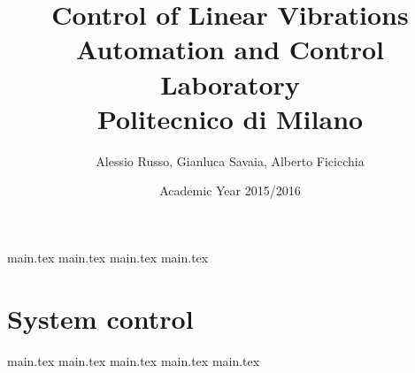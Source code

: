 \documentclass[10pt,a4paper]{report}
\author{Alessio Russo, Gianluca Savaia, Alberto Ficicchia}
\title{Control of Linear Vibrations \\
\Large Automation and Control Laboratory \\
 Politecnico di Milano}
\date{Academic Year 2015/2016}
\begin{document}
\maketitle
\tableofcontents

{main.tex}
{main.tex}
\newpage
{main.tex}
\newpage
{main.tex}
\newpage
\part{System control}
	{main.tex}
\newpage
{main.tex}
\newpage
{main.tex}
\newpage
{main.tex}
\newpage
{main.tex}

\printbibliography
\end{document}
